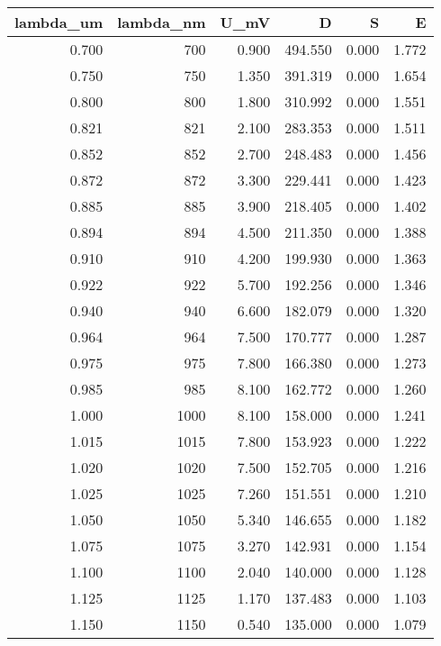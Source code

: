 \begin{tabular}{rrrrrr}
\toprule
lambda_um & lambda_nm & U_mV & D & S & E \\
\midrule
0.700 & 700 & 0.900 & 494.550 & 0.000 & 1.772 \\
0.750 & 750 & 1.350 & 391.319 & 0.000 & 1.654 \\
0.800 & 800 & 1.800 & 310.992 & 0.000 & 1.551 \\
0.821 & 821 & 2.100 & 283.353 & 0.000 & 1.511 \\
0.852 & 852 & 2.700 & 248.483 & 0.000 & 1.456 \\
0.872 & 872 & 3.300 & 229.441 & 0.000 & 1.423 \\
0.885 & 885 & 3.900 & 218.405 & 0.000 & 1.402 \\
0.894 & 894 & 4.500 & 211.350 & 0.000 & 1.388 \\
0.910 & 910 & 4.200 & 199.930 & 0.000 & 1.363 \\
0.922 & 922 & 5.700 & 192.256 & 0.000 & 1.346 \\
0.940 & 940 & 6.600 & 182.079 & 0.000 & 1.320 \\
0.964 & 964 & 7.500 & 170.777 & 0.000 & 1.287 \\
0.975 & 975 & 7.800 & 166.380 & 0.000 & 1.273 \\
0.985 & 985 & 8.100 & 162.772 & 0.000 & 1.260 \\
1.000 & 1000 & 8.100 & 158.000 & 0.000 & 1.241 \\
1.015 & 1015 & 7.800 & 153.923 & 0.000 & 1.222 \\
1.020 & 1020 & 7.500 & 152.705 & 0.000 & 1.216 \\
1.025 & 1025 & 7.260 & 151.551 & 0.000 & 1.210 \\
1.050 & 1050 & 5.340 & 146.655 & 0.000 & 1.182 \\
1.075 & 1075 & 3.270 & 142.931 & 0.000 & 1.154 \\
1.100 & 1100 & 2.040 & 140.000 & 0.000 & 1.128 \\
1.125 & 1125 & 1.170 & 137.483 & 0.000 & 1.103 \\
1.150 & 1150 & 0.540 & 135.000 & 0.000 & 1.079 \\
\bottomrule
\end{tabular}
